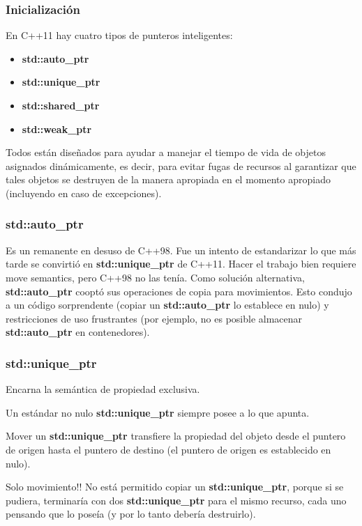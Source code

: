 \documentclass{beamer}
\begin{document}
	\begin{frame}
		\frametitle{Inicializaci\'on}
		En C++11 hay cuatro tipos de punteros inteligentes:
		\begin{itemize}
			\item \textbf{std::auto\_ptr}
			
			\item \textbf{std::unique\_ptr}
			
			\item \textbf{std::shared\_ptr}
			
			\item \textbf{std::weak\_ptr}
		\end{itemize}
	
	Todos están diseñados para ayudar a manejar el tiempo de vida de objetos asignados dinámicamente, es decir, para evitar fugas de recursos al garantizar que tales objetos se destruyen de la manera apropiada en el momento apropiado (incluyendo en caso de excepciones).
	\end{frame}
	
	\begin{frame}
		\frametitle{std::auto\_ptr}
		Es un remanente en desuso de C++98. 
		Fue un intento de estandarizar lo que más tarde se convirtió en \textbf{std::unique\_ptr} de C++11. Hacer el trabajo bien requiere move semantics, pero C++98 no las tenía. Como solución alternativa, \textbf{std::auto\_ptr} cooptó sus operaciones de copia para movimientos. Esto condujo a un código sorprendente (copiar un \textbf{std::auto\_ptr} lo establece en nulo) y restricciones de uso frustrantes (por ejemplo, no es posible almacenar \textbf{std::auto\_ptr} en contenedores).
	\end{frame}

	\begin{frame}
		\frametitle{std::unique\_ptr}
		Encarna la semántica de propiedad exclusiva. 
		
		Un estándar no nulo \textbf{std::unique\_ptr} siempre posee a lo que apunta.
		
		Mover un \textbf{std::unique\_ptr} transfiere la propiedad del objeto desde el puntero de origen hasta el puntero de destino (el puntero de origen es establecido en nulo). 
		
		\begin{alertblock}{Solo movimiento!!}
			No está permitido copiar un \textbf{std::unique\_ptr}, porque si se pudiera, terminaría con dos \textbf{std::unique\_ptr} para el mismo recurso, cada uno pensando que lo pose\'ia (y por lo tanto debería destruirlo).
		\end{alertblock} 
	\end{frame}
	
\end{document}
